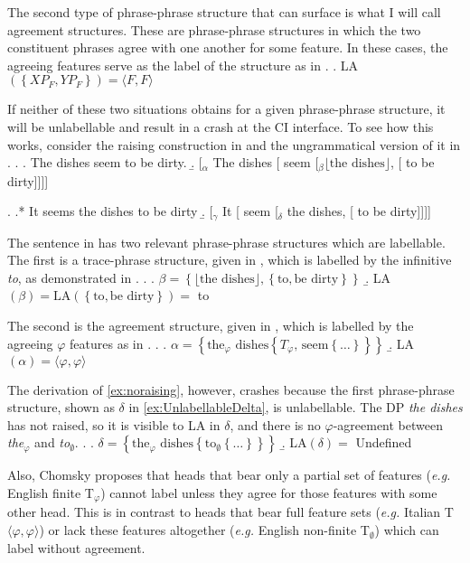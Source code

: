 \documentclass[MilwayThesis]{subfiles}
\begin{document}
The second type of phrase-phrase structure that can surface is what I will call agreement structures.
These are phrase-phrase structures in which the two constituent phrases agree with one another for some feature.
In these cases, the agreeing features serve as the label of the structure as in \Next.
\ex. LA$(\left\{ XP_F, YP_F \right\}) = \langle F,F\rangle$

If neither of these two situations obtains for a given phrase-phrase structure, it will be unlabellable and result in a crash at the CI interface.
To see how this works, consider the raising construction in \Next and the ungrammatical version of it in \NNext.
\ex.\label{ex:raising}
\a. The dishes seem to be dirty.
\b. [$_\alpha$ The dishes [ seem [$_\beta \lfloor\text{the dishes}\rfloor$, [ to be dirty]]]]

\ex.\label{ex:noraising}
\a.* It seems the dishes to be dirty
\b. [$_\gamma$ It [ seem [$_\delta$ the dishes, [ to be dirty]]]]

The sentence in \LLast has two relevant phrase-phrase structures which are labellable.
The first is a trace-phrase structure, given in \Next[a], which is labelled by the infinitive \textit{to}, as demonstrated in \Next[b].
\ex.
\a.  $\beta = \left\{ \lfloor\text{the dishes}\rfloor, \left\{ \text{to}, \text{be dirty} \right\} \right\}$
\b. LA$(\beta) = \text{LA}(\left\{ \text{to}, \text{be dirty} \right\}) =$ to

The second is the agreement structure, given in \Next[b], which is labelled by the agreeing $\varphi$ features as in \Next[b].
\ex.
\a. $\alpha = \left\{ \text{the}_\varphi \text{ dishes} \left\{ T_\varphi \text{, seem} \left\{ \ldots \right\} \right\} \right\}$
\b. LA$(\alpha) = \langle\varphi, \varphi\rangle$

The derivation of \ref{ex:noraising}, however, crashes because the first phrase-phrase structure, shown as $\delta$ in \cref{ex:UnlabellableDelta}, is unlabellable.
The DP \textit{the dishes} has not raised, so it is visible to LA in $\delta$, and there is no $\varphi$-agreement between \textit{the}$_\varphi$ and \textit{to}$_\emptyset$.
\ex.\label{ex:UnlabellableDelta}
\a. $\delta = \left\{ \text{the}_\varphi \text{ dishes} \left\{ \text{to}_\emptyset \left\{ \ldots \right\}\right\} \right\}$
\b. LA$(\delta) = $ Undefined


Also, Chomsky proposes that heads that bear only a partial set of features (\textit{e.g.} English finite T$_\varphi$) cannot label unless they agree for those features with some other head.
This is in contrast to heads that bear full feature sets (\textit{e.g.} Italian T${\langle\varphi,\varphi\rangle}$) or lack these features altogether (\textit{e.g.} English non-finite T$_\emptyset$) which can label without agreement.
\end{document}
